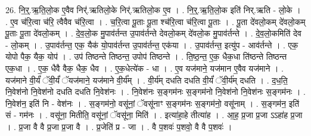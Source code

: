 \documentclass[17pt]{extarticle}
\begin{document}
26. नि॒र्॒.ऋ॒ति॒लो॒क ए॒वैव निर्॑.ऋतिलो॒के निर्॑.ऋतिलो॒क ए॒व । . नि॒र्॒.ऋ॒ति॒लो॒क इति॑ निर्.ऋति - लो॒के । . ए॒व च॑रि॒त्वा च॑रि॒ त्वैवैव च॑रि॒त्वा । . च॒रि॒त्वा पू॒ताः पू॒ता श्च॑रि॒त्वा च॑रि॒त्वा पू॒ताः । . पू॒ता दे॑वलो॒कम् दे॑वलो॒कम् पू॒ताः पू॒ता दे॑वलो॒कम् । . दे॒व॒लो॒क मु॒पाव॑र्तन्त उ॒पाव॑र्तन्ते देवलो॒कम् दे॑वलो॒क मु॒पाव॑र्तन्ते । . दे॒व॒लो॒कमिति॑ देव - लो॒कम् । . उ॒पाव॑र्तन्त॒ एक॒ यैक॑ यो॒पाव॑र्तन्त उ॒पाव॑र्तन्त॒ एक॑या । . उ॒पाव॑र्तन्त॒ इत्यु॑प - आव॑र्तन्ते । . एक॒ योपो पैक॒ यैक॒ योप॑ । . उप॑ तिष्ठन्ते तिष्ठन्त॒ उपोप॑ तिष्ठन्ते । . ति॒ष्ठ॒न्त॒ ए॒क॒ धैक॒धा ति॑ष्ठन्ते तिष्ठन्त एक॒धा । . ए॒क॒ धैवै वैक॒ धैक॒ धैव । . ए॒क॒धेत्ये॑क - धा । . ए॒व यज॑माने॒ यज॑मान ए॒वैव यज॑माने । . यज॑माने वी॒र्यं॑ ॅवी॒र्यं॑ ॅयज॑माने॒ यज॑माने वी॒र्य᳚म् । . वी॒र्य॑म् दधति दधति वी॒र्यं॑ ॅवी॒र्य॑म् दधति । . द॒ध॒ति॒ नि॒वेश॑नो नि॒वेश॑नो दधति दधति नि॒वेश॑नः । . नि॒वेश॑नः स॒ङ्गम॑नः स॒ङ्गम॑नो नि॒वेश॑नो नि॒वेश॑नः स॒ङ्गम॑नः । . नि॒वेश॑न॒ इति॑ नि - वेश॑नः । . स॒ङ्गम॑नो॒ वसू॑नां॒ ॅवसू॑नाꣳ स॒ङ्गम॑नः स॒ङ्गम॑नो॒ वसू॑नाम् । . स॒ङ्गम॑न॒ इति॑ सं - गम॑नः । . वसू॑ना॒ मितीति॒ वसू॑नां॒ ॅवसू॑ना॒ मिति॑ । . इत्या॑हा॒हे तीत्या॑ह । . आ॒ह॒ प्र॒जा प्र॒जा ऽऽहा॑ह प्र॒जा । . प्र॒जा वै वै प्र॒जा प्र॒जा वै । . प्र॒जेति॑ प्र - जा । . वै प॒शवः॑ प॒शवो॒ वै वै प॒शवः॑ । \newline
\end{document}
